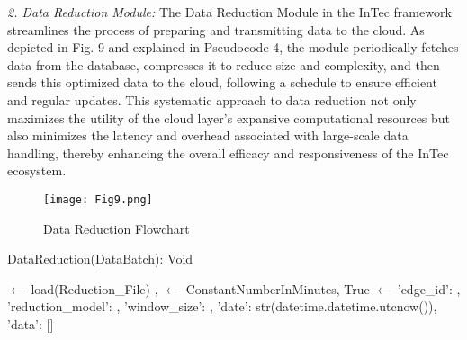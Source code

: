 \documentclass[11pt]{article}
\begin{document}
	\textit{2. Data Reduction Module:} The Data Reduction Module in the InTec framework
	streamlines the process of preparing and transmitting data to the cloud. As
	depicted in Fig. 9 and explained in Pseudocode 4, the module periodically fetches
	data from the database, compresses it to reduce size and complexity, and then
	sends this optimized data to the cloud, following a schedule to ensure efficient
	and regular updates. This systematic approach to data reduction not only maximizes the utility of the cloud layer’s expansive computational resources but also
	minimizes the latency and overhead associated with large-scale data handling,
	thereby enhancing the overall efficacy and responsiveness of the InTec ecosystem.
	
	\begin{figure}[h]
		\centering
		\texttt{[image: Fig9.png]}
		\caption{Data Reduction Flowchart}
	\end{figure}
	
	\begin{algorithm}[t]
		
		\caption{DataReduction(DataBatch): Void}\label{alg:data-reduction}
		
		\BlankLine
		\ReductionModel $\leftarrow$ load(Reduction\_File)\;
		\Interval, \ClientLoopFlag $\leftarrow$ ConstantNumberInMinutes, True\;
		\Message $\leftarrow$ {
			'edge\_id': \EdgeClientId,
			'reduction\_model': \ReductionModelName,
			'window\_size': \SlidingWindowSize,
			'date': str(datetime.datetime.utcnow()),
			'data': []
		}\;
	\end{algorithm}
	
\end{document}

